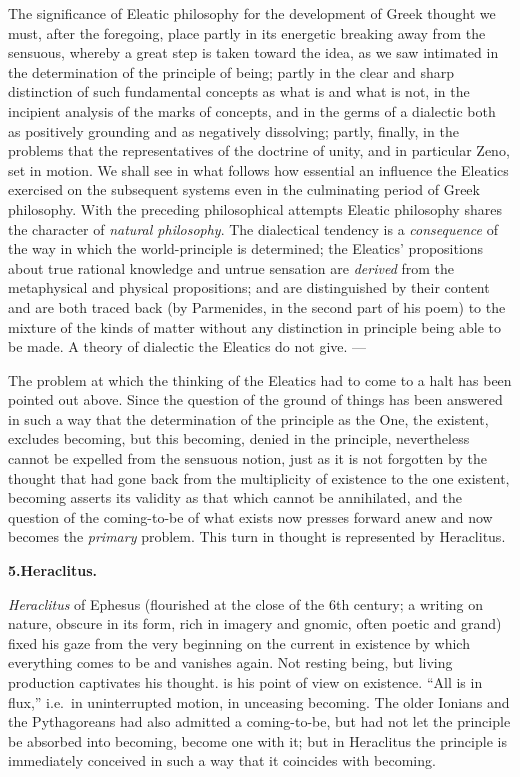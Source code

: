 \divrule

The significance of Eleatic philosophy for the development of Greek
thought we must, after the foregoing, place
partly in its energetic breaking away from the sensuous, whereby
a great step is taken toward the idea, as we saw intimated in
the determination of the principle of being; partly in the clear and sharp
distinction of such fundamental concepts as what is and what
is not, in the incipient analysis of the marks of concepts,
and in the germs of a dialectic both as positively grounding and as negatively dissolving; partly, finally, in
the problems that the representatives of the doctrine of unity, and in particular Zeno,
set in motion. We shall see in what follows how
essential an influence the Eleatics exercised on the subsequent
systems even in the culminating period of Greek philosophy.
With the preceding philosophical attempts Eleatic philosophy shares the character of \emph{natural philosophy}. The
dialectical tendency is a \emph{consequence} of the way in
which the world-principle is determined; the Eleatics' propositions about
true rational knowledge and untrue sensation are
\emph{derived} from the metaphysical and physical propositions; 
and  are distinguished by their content and are both traced back (by Parmenides,
in the second part of his poem) to the mixture of the kinds of matter without any distinction in principle being able to be made. A theory
of dialectic the Eleatics do not give. ---

The problem at which the thinking of the Eleatics had to
come to a halt has been pointed out above. Since the question of the ground of things
has been answered in such a way that the determination of the principle as
the One, the existent, excludes becoming, but this becoming, denied in the principle,
nevertheless cannot be expelled from the sensuous
notion, just as it is not forgotten by the thought that had gone back from the multiplicity of existence to the one existent,
becoming asserts its validity as that which cannot be
annihilated, and the question of the coming-to-be of what exists
now presses forward anew and now becomes the \emph{primary} problem. This turn in thought is represented by Heraclitus.

\divrule

\begin{center}
\textbf{5.\enspace Heraclitus.}
\end{center}

\emph{Heraclitus} of Ephesus (flourished at the close of the 6th
century; a writing on nature, obscure in its form, rich in imagery and
gnomic, often poetic and grand) fixed his gaze from the very beginning
on the current in existence by which everything comes to be and
vanishes again. Not resting being, but living production captivates
his thought.  is his point of view on existence. ``All
is in flux,'' i.e.\ in uninterrupted motion, in unceasing becoming. The
older Ionians and the Pythagoreans had also admitted a coming-to-be,
but had not let the principle be absorbed into becoming,
become one with it; but in Heraclitus the principle is immediately
conceived in such a way that it coincides with becoming.


